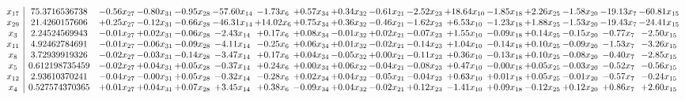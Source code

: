 \documentclass[9pt]{article}
\begin{document}
 \[\begin{array}{c| c c@{\hskip 2pt} c@{\hskip 2pt} c@{\hskip 2pt} c@{\hskip 2pt} c@{\hskip 2pt} c@{\hskip 2pt} c@{\hskip 2pt} c@{\hskip 2pt} c@{\hskip 2pt} c@{\hskip 2pt} c@{\hskip 2pt} c@{\hskip 2pt} c@{\hskip 2pt} c@{\hskip 2pt} c@{\hskip 2pt} }
 x_{17}   &  75.3716536738 & -0.56 x_{27} & -0.80 x_{31} & -0.95 x_{28} & -57.60 x_{14} & -1.73 x_{6} & +  0.57 x_{34} & +  0.34 x_{32} & -0.61 x_{21} & -2.52 x_{23} & + 18.64 x_{10} & -1.85 x_{18} & +  2.26 x_{25} & -1.58 x_{20} & -19.13 x_{7} & -60.81 x_{15}\\
 x_{29}   &  21.4260157606 & +  0.25 x_{27} & -0.12 x_{31} & -0.66 x_{28} & -46.31 x_{14} & + 14.02 x_{6} & +  0.75 x_{34} & +  0.36 x_{32} & -0.46 x_{21} & -1.62 x_{23} & +  6.53 x_{10} & -1.23 x_{18} & +  1.88 x_{25} & -1.53 x_{20} & -19.43 x_{7} & -24.41 x_{15}\\
 x_{3}   &  2.24524569943 & -0.01 x_{27} & +  0.02 x_{31} & -0.06 x_{28} & -2.43 x_{14} & +  0.17 x_{6} & +  0.08 x_{34} & -0.01 x_{32} & +  0.02 x_{21} & -0.07 x_{23} & +  1.55 x_{10} & -0.09 x_{18} & +  0.14 x_{25} & -0.15 x_{20} & -0.77 x_{7} & -2.50 x_{15}\\
 x_{11}   &  4.92462784691 & -0.01 x_{27} & -0.06 x_{31} & -0.09 x_{28} & -4.11 x_{14} & -0.25 x_{6} & +  0.06 x_{34} & +  0.01 x_{32} & -0.02 x_{21} & -0.14 x_{23} & +  1.04 x_{10} & -0.14 x_{18} & +  0.10 x_{25} & -0.09 x_{20} & -1.53 x_{7} & -3.26 x_{15}\\
 x_{8}   &  3.72939919326 & -0.02 x_{27} & -0.03 x_{31} & -0.14 x_{28} & -3.47 x_{14} & +  0.17 x_{6} & +  0.04 x_{34} & -0.05 x_{32} & +  0.00 x_{21} & -0.11 x_{23} & +  0.36 x_{10} & -0.13 x_{18} & +  0.10 x_{25} & -0.08 x_{20} & -0.40 x_{7} & -2.85 x_{15}\\
 x_{5}   &  0.612198735459 & -0.02 x_{27} & +  0.04 x_{31} & +  0.05 x_{28} & -0.37 x_{14} & +  0.24 x_{6} & +  0.00 x_{34} & +  0.06 x_{32} & -0.04 x_{21} & -0.08 x_{23} & +  0.47 x_{10} & -0.00 x_{18} & +  0.05 x_{25} & -0.03 x_{20} & -0.52 x_{7} & -0.56 x_{15}\\
 x_{12}   &  2.93610370241 & -0.04 x_{27} & -0.00 x_{31} & +  0.05 x_{28} & -0.32 x_{14} & -0.28 x_{6} & +  0.02 x_{34} & +  0.04 x_{32} & -0.05 x_{21} & -0.04 x_{23} & +  0.63 x_{10} & +  0.01 x_{18} & +  0.05 x_{25} & -0.01 x_{20} & -0.57 x_{7} & -0.24 x_{15}\\
 x_{4}   &  0.527574370365 & +  0.01 x_{27} & +  0.04 x_{31} & +  0.07 x_{28} & +  3.45 x_{14} & +  0.38 x_{6} & -0.09 x_{34} & +  0.04 x_{32} & -0.02 x_{21} & +  0.12 x_{23} & -1.41 x_{10} & +  0.09 x_{18} & -0.12 x_{25} & +  0.12 x_{20} & +  0.86 x_{7} & +  2.60 x_{15}\\

\end{array}\]
\end{document}
